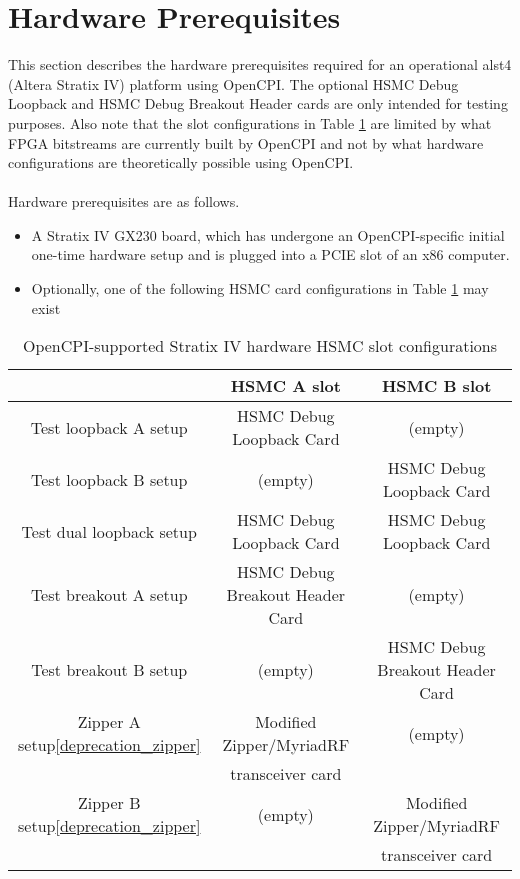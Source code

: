 \section{Hardware Prerequisites}
This section describes the hardware prerequisites required for an operational alst4 (Altera Stratix IV) platform using OpenCPI. The optional HSMC Debug Loopback and HSMC Debug Breakout Header cards are only intended for testing purposes. Also note that the slot configurations in Table \ref{table:supported_slots} are limited by what FPGA bitstreams are currently built by OpenCPI and not by what hardware configurations are theoretically possible using OpenCPI.\\ \\
Hardware prerequisites are as follows.
\begin{itemize}
\item A Stratix IV GX230 board, which has undergone an OpenCPI-specific initial one-time hardware setup \cite{alst4_hardware_setup} and is plugged into a PCIE slot of an x86 computer.
\item Optionally, one of the following HSMC card configurations in Table  \ref{table:supported_slots} may exist
\end{itemize}
\begin{center}
        \begin{table}[!htbp]
        \centering
        \caption{OpenCPI-supported Stratix IV hardware HSMC slot configurations}
        \label{table:supported_slots}
        \begin{tabular}{c|c|c|}
                \cline{2-3}
                & HSMC A slot & HSMC B slot \\ \hline
                \multicolumn{1}{|c|}{Test loopback A setup} & HSMC Debug Loopback Card & (empty)\\ \hline
                \multicolumn{1}{|c|}{Test loopback B setup} & (empty) & HSMC Debug Loopback Card \\ \hline
                \multicolumn{1}{|c|}{Test dual loopback setup} & HSMC Debug Loopback Card & HSMC Debug Loopback Card \\ \hline
                \multicolumn{1}{|c|}{Test breakout A setup} & HSMC Debug Breakout Header Card & (empty)\\ \hline
                \multicolumn{1}{|c|}{Test breakout B setup} & (empty) & HSMC Debug Breakout Header Card \\ \hline
                \multicolumn{1}{|c|}{Zipper A setup\ref{deprecation_zipper}} & Modified\cite{zipper_mods} Zipper/MyriadRF & (empty)\\
                \multicolumn{1}{|c|}{ } & transceiver card & \\ \hline
                \multicolumn{1}{|c|}{Zipper B setup\ref{deprecation_zipper}} & (empty) & Modified\cite{zipper_mods} Zipper/MyriadRF \\
                \multicolumn{1}{|c|}{ } & & transceiver card \\ \hline
        \end{tabular}
        \end{table}
\end{center}

